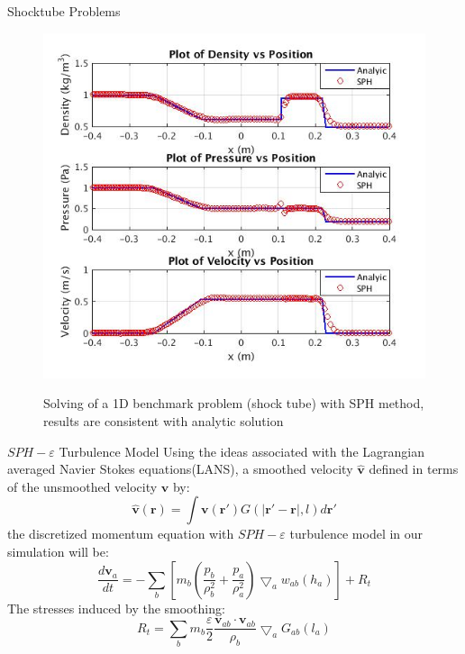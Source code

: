 \documentclass[final]{beamer}
\newlength{\onecolwid}
\begin{document}
\begin{frame}[t]
\begin{columns}[t]
\begin{column}{\onecolwid}
\begin{block}{Shocktube Problems}
\begin{figure}
\centering
{\includegraphics[height= 0.650\linewidth]{shocktube}}
\caption{Solving of a 1D benchmark problem (shock tube) with SPH method, results are consistent with analytic solution}
\label{fig:effect_of_turbulence}
\end{figure}
\end{block}


\begin{block}{ $SPH-\varepsilon$ Turbulence Model \cite{monaghan2011turbulence}}
Using the ideas associated with the Lagrangian averaged Navier Stokes equations(LANS), a smoothed velocity $\widehat{\textbf{v}}$ 
defined in terms of the unsmoothed velocity $\textbf{v}$ by:
\begin{equation}
\widehat{\textbf{v}}(\textbf{r})=\int \textbf{v}(\textbf{r} \prime)G(\vert \textbf{r} \prime - \textbf{r} \vert, l) d\textbf{r} \prime
\end{equation}
the discretized momentum equation with $SPH-\varepsilon$ turbulence model in our simulation will be:
\begin{equation}
\label{eq:SPH-mom-epsilon-turb}
\dfrac{d \textbf{v}_a}{dt} = -\sum_b [m_b (\dfrac{p_b}{\rho_b^2} + \dfrac{p_a}{\rho_a^2}) \bigtriangledown_aw_{a b}(h_a)] + R_t
\end{equation}
The stresses induced by the smoothing:
\begin{equation}
R_t=\sum_b m_b \dfrac{\varepsilon}{2} \dfrac{\textbf{v}_{ab} \cdot \textbf{v}_{ab}}{\rho_b} \bigtriangledown_aG_{ab}(l_a)
\end{equation}
 

\end{block}
\end{column}
\end{columns}
\end{frame}
\end{document}
